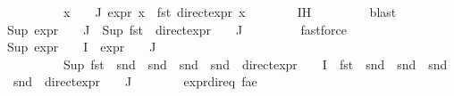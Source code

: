\begin{isabellebody}
\ \ \ \ \ \ \ \ \ \ {\isachardoublequoteopen}{\isasymforall}x\ {\isasymin}\ {\isasymPhi}\ {\isacharbackquote}{\kern0pt}\ J{\isachardot}{\kern0pt}\ expr{\isacharunderscore}{\kern0pt}{}\ x\ {\isacharequal}{\kern0pt}\ fst\ {\isacharparenleft}{\kern0pt}direct{\isacharunderscore}{\kern0pt}expr\ x{\isacharparenright}{\kern0pt}{\isachardoublequoteclose}\isanewline
\ \ \ \ \ \ \isamarkupfalse%
\ IH\ \isanewline
\ \ \ \ \ \ \isamarkupfalse%
\ blast{\isacharplus}{\kern0pt}\isanewline
\ \ \ \ \isamarkupfalse%
\ {\isachardoublequoteopen}Sup\ {\isacharparenleft}{\kern0pt}{\isacharparenleft}{\kern0pt}expr{\isacharunderscore}{\kern0pt}{}\ {\isasymcirc}\ {\isasymPhi}{\isacharparenright}{\kern0pt}\ {\isacharbackquote}{\kern0pt}\ J\ {\isacharparenright}{\kern0pt}{\isacharequal}{\kern0pt}\ Sup\ {\isacharparenleft}{\kern0pt}{\isacharparenleft}{\kern0pt}fst\ {\isasymcirc}\ direct{\isacharunderscore}{\kern0pt}expr\ {\isasymcirc}\ {\isasymPhi}{\isacharparenright}{\kern0pt}\ {\isacharbackquote}{\kern0pt}\ J{\isacharparenright}{\kern0pt}{\isachardoublequoteclose}\ \isanewline
\ \ \ \ \ \ \isamarkupfalse%
\ fastforce\isanewline
\ \ \ \ \isamarkupfalse%
\ {\isachardoublequoteopen}Sup\ {\isacharparenleft}{\kern0pt}{\isacharparenleft}{\kern0pt}expr{\isacharunderscore}{\kern0pt}{}\ {\isasymcirc}\ {\isasymPhi}{\isacharparenright}{\kern0pt}\ {\isacharbackquote}{\kern0pt}\ I\ {\isasymunion}\ {\isacharparenleft}{\kern0pt}expr{\isacharunderscore}{\kern0pt}{}\ {\isasymcirc}\ {\isasymPhi}{\isacharparenright}{\kern0pt}\ {\isacharbackquote}{\kern0pt}\ J{\isacharparenright}{\kern0pt}\ {\isacharequal}{\kern0pt}\ \isanewline
\ \ \ \ \ \ \ \ \ \ Sup\ {\isacharparenleft}{\kern0pt}{\isacharparenleft}{\kern0pt}fst\ {\isasymcirc}\ snd\ {\isasymcirc}\ snd\ {\isasymcirc}\ snd\ {\isasymcirc}\ snd\ {\isasymcirc}\ direct{\isacharunderscore}{\kern0pt}expr\ {\isasymcirc}\ {\isasymPhi}{\isacharparenright}{\kern0pt}\ {\isacharbackquote}{\kern0pt}\ I\ {\isasymunion}\ {\isacharparenleft}{\kern0pt}fst\ {\isasymcirc}\ snd\ {\isasymcirc}\ snd\ {\isasymcirc}\ snd\ {\isasymcirc}\ snd\ {\isasymcirc}\ direct{\isacharunderscore}{\kern0pt}expr\ {\isasymcirc}\ {\isasymPhi}{\isacharparenright}{\kern0pt}\ {\isacharbackquote}{\kern0pt}\ J{\isacharparenright}{\kern0pt}{\isachardoublequoteclose}\isanewline
\ \ \ \ \ \ \isamarkupfalse%
\ expr{\isacharunderscore}{\kern0pt}{}{\isacharunderscore}{\kern0pt}dir{\isacharunderscore}{\kern0pt}eq\ fa{\isacharunderscore}{\kern0pt}e{}\ \isamarkupfalse%

\end{isabellebody}
